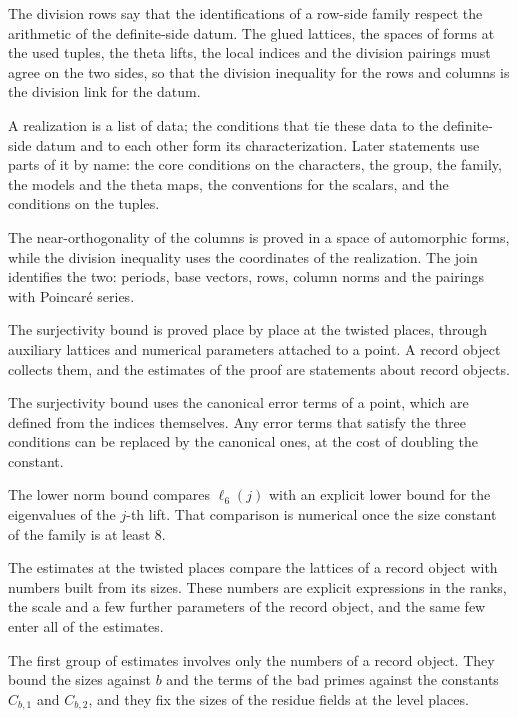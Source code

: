 The division rows say that the identifications of a row-side family respect the arithmetic of the
definite-side datum. The glued lattices, the spaces of forms at the used tuples, the theta lifts,
the local indices and the division pairings must agree on the two sides, so that the division
inequality for the rows and columns is the division link for the datum.

A realization is a list of data; the conditions that tie these data to the definite-side datum and to
each other form its characterization. Later statements use parts of it by name: the core conditions on
the characters, the group, the family, the models and the theta maps, the conventions for the scalars,
and the conditions on the tuples.

The near-orthogonality of the columns is proved in a space of automorphic forms, while the division
inequality uses the coordinates of the realization. The join identifies the two: periods, base
vectors, rows, column norms and the pairings with Poincaré series.

The surjectivity bound is proved place by place at the twisted places, through auxiliary lattices
and numerical parameters attached to a point. A record object collects them, and the estimates of
the proof are statements about record objects.

The surjectivity bound uses the canonical error terms of a point, which are defined from the indices
themselves. Any error terms that satisfy the three conditions can be replaced by the canonical ones,
at the cost of doubling the constant.

The lower norm bound compares $\ell_6(j)$ with an explicit lower bound for the eigenvalues of the
$j$-th lift. That comparison is numerical once the size constant of the family is at least $8$.

The estimates at the twisted places compare the lattices of a record object with numbers built from
its sizes. These numbers are explicit expressions in the ranks, the scale and a few further
parameters of the record object, and the same few enter all of the estimates.

The first group of estimates involves only the numbers of a record object. They bound the sizes
against $b$ and the terms of the bad primes against the constants $C_{b,1}$ and $C_{b,2}$, and they
fix the sizes of the residue fields at the level places.

